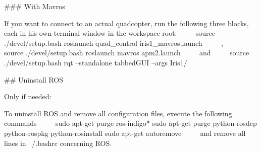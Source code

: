 \#\#\# With Mavros

If you want to connect to an actual quadcopter, run the following three blocks, each in his own terminal window in the workspace root:
~~~~
source ./devel/setup.bash
roslaunch quad\_control iris1\_mavros.launch
~~~~
,
~~~~
source ./devel/setup.bash
roslaunch mavros apm2.launch
~~~~
and 
~~~~
source ./devel/setup.bash
rqt --standalone  tabbedGUI --args Iris1/
~~~~

\#\# Uninstall ROS

Only if needed:

To uninstall ROS and remove all configuration files, execute the following commands
~~~~
sudo apt-get purge ros-indigo*
sudo apt-get purge python-rosdep python-rospkg python-rosinstall
sudo apt-get autoremove
~~~~
and remove all lines in  ~/.bashrc  concerning ROS.
